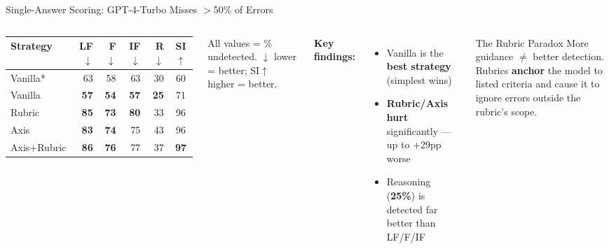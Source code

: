 \documentclass[aspectratio=169,10pt]{beamer}
\newcommand{\good}[1]{\textcolor{green!60!black}{\textbf{#1}}}
\newcommand{\bad}[1]{\textcolor{aclred}{\textbf{#1}}}
\begin{document}
\begin{frame}{Single-Answer Scoring: GPT-4-Turbo Misses $>$50\% of Errors}
  \begin{columns}[T]
      \small
      \begin{tabular}{lrrrrc}
        \toprule
        \textbf{Strategy} & \textbf{LF}$\downarrow$ & \textbf{F}$\downarrow$ & \textbf{IF}$\downarrow$ & \textbf{R}$\downarrow$ & \textbf{SI}$\uparrow$ \\
        \midrule
        Vanilla*      & 63 & 58 & 63 & 30 & 60 \\
        \rowcolor{acllightblue}
        Vanilla       & \good{57} & \good{54} & \good{57} & \good{25} & 71 \\
        Rubric        & \bad{85} & \bad{73} & \bad{80} & 33 & 96 \\
        Axis          & \bad{83} & \bad{74} & 75 & 43 & 96 \\
        Axis+Rubric   & \bad{86} & \bad{76} & 77 & 37 & \good{97} \\
        \bottomrule
      \end{tabular}
      \vspace{0.3em}
      \small All values = \% undetected. $\downarrow$ lower = better; SI$\uparrow$ higher = better.

      \textbf{Key findings:}
      \begin{itemize}
        \item Vanilla is the \good{best strategy} (simplest wins)
        \item \bad{Rubric/Axis hurt} significantly — up to +29pp worse
        \item Reasoning (\good{25\%}) is detected far better than LF/F/IF
      \end{itemize}

      \vspace{0.5em}
      \begin{alertblock}{The Rubric Paradox}
        More guidance $\neq$ better detection.\\
        Rubrics \textbf{anchor} the model to listed criteria and cause it to ignore errors outside the rubric's scope.
      \end{alertblock}
  \end{columns}
\end{frame}
\end{document}
